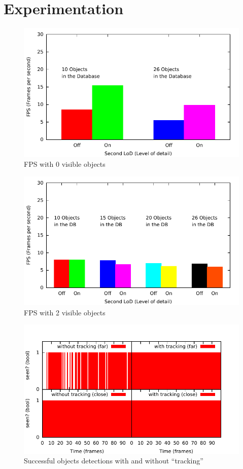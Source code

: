 \section{Experimentation}

\begin{figure}[H]
  \includegraphics[width=1.0\textwidth]{images/fps-0-objects.pdf}
  \caption{FPS with 0 visible objects}
\end{figure}

\begin{figure}[H]
  \includegraphics[width=1.0\textwidth]{images/fps-2-objects.pdf}
  \caption{FPS with 2 visible objects}
\end{figure}

\begin{figure}[H]
  \includegraphics[width=1.0\textwidth]{images/perceptions.pdf}
  \caption{Successful objects detections with and without ``tracking''}
\end{figure}

